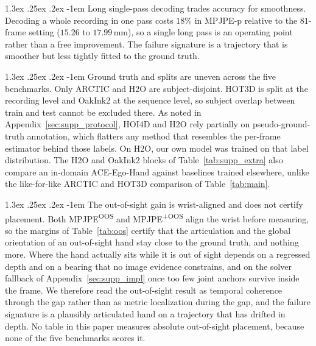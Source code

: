\documentclass[10pt,twocolumn,letterpaper]{article}
\makeatletter
\renewcommand\paragraph{\@startsection{paragraph}{4}{\z@}%
  {1.3ex \@plus .25ex \@minus .2ex}%
  {-1em}%
  {\normalfont\normalsize\bfseries}}
\newcommand{\method}{ACE-Ego-Hand} %
\makeatother
\begin{document}
\paragraph{Long single-pass decoding trades accuracy for smoothness.} Decoding a whole recording in one pass costs $18\%$ in MPJPE-p relative to the $81$-frame setting ($15.26$ to $17.99$\,mm), so a single long pass is an operating point rather than a free improvement. The failure signature is a trajectory that is smoother but less tightly fitted to the ground truth.

\paragraph{Ground truth and splits are uneven across the five benchmarks.} Only ARCTIC and H2O are subject-disjoint. HOT3D is split at the recording level and OakInk2 at the sequence level, so subject overlap between train and test cannot be excluded there. As noted in Appendix~\ref{sec:supp_protocol}, HOI4D and H2O rely partially on pseudo-ground-truth annotation, which flatters any method that resembles the per-frame estimator behind those labels. On H2O, our own model was trained on that label distribution. The H2O and OakInk2 blocks of Table~\ref{tab:supp_extra} also compare an in-domain \method{} against baselines trained elsewhere, unlike the like-for-like ARCTIC and HOT3D comparison of Table~\ref{tab:main}.

\paragraph{The out-of-sight gain is wrist-aligned and does not certify placement.} Both MPJPE\textsuperscript{OOS} and MPJPE\textsuperscript{+OOS} align the wrist before measuring, so the margins of Table~\ref{tab:oos} certify that the articulation and the global orientation of an out-of-sight hand stay close to the ground truth, and nothing more. Where the hand actually sits while it is out of sight depends on a regressed depth and on a bearing that no image evidence constrains, and on the solver fallback of Appendix~\ref{sec:supp_impl} once too few joint anchors survive inside the frame. We therefore read the out-of-sight result as temporal coherence through the gap rather than as metric localization during the gap, and the failure signature is a plausibly articulated hand on a trajectory that has drifted in depth. No table in this paper measures absolute out-of-sight placement, because none of the five benchmarks scores it.
\end{document}
